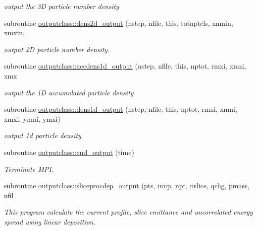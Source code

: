 \begin{DoxyCompactItemize}
\begin{DoxyCompactList}\small\item\em output the 3D particle number density \end{DoxyCompactList}\item 
subroutine \mbox{\hyperlink{namespaceoutputclass_ab7f55098e75e7410bbbb6ffa50148508}{outputclass\+::dens2d\+\_\+output}} (nstep, nfile, this, totnptcls, xmnin, xmxin,
\begin{DoxyCompactList}\small\item\em output 2D particle number density. \end{DoxyCompactList}\item 
subroutine \mbox{\hyperlink{namespaceoutputclass_ac66061da2efec314c456fc5e7ed4fc8b}{outputclass\+::accdens1d\+\_\+output}} (nstep, nfile, this, nptot, rmxi, xmni, xmx
\begin{DoxyCompactList}\small\item\em output the 1D accumulated particle density \end{DoxyCompactList}\item 
subroutine \mbox{\hyperlink{namespaceoutputclass_acc8a8c481be8eb7a7ebb49852db14185}{outputclass\+::dens1d\+\_\+output}} (nstep, nfile, this, nptot, rmxi, xmni, xmxi, ymni, ymxi)
\begin{DoxyCompactList}\small\item\em output 1d particle density \end{DoxyCompactList}\item 
subroutine \mbox{\hyperlink{namespaceoutputclass_af40e04d104fbdb28b9cae7fb5fcba121}{outputclass\+::end\+\_\+output}} (time)
\begin{DoxyCompactList}\small\item\em Terminate M\+PI. \end{DoxyCompactList}\item 
subroutine \mbox{\hyperlink{namespaceoutputclass_aaba51e45761070d95883093a25e402c4}{outputclass\+::sliceprocdep\+\_\+output}} (pts, innp, npt, nslice, qchg, pmass, nfil
\begin{DoxyCompactList}\small\item\em This program calculate the current profile, slice emittance and uncorrelated energy spread using linear deposition. \end{DoxyCompactList}\end{DoxyCompactItemize}
